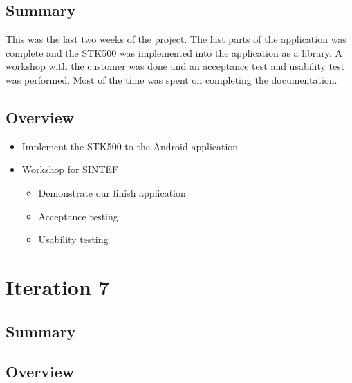 \subsection{Summary}
	This was the last two weeks of the project. The last parts of the application was complete and the STK500 was implemented into the application as a library.
	A workshop with the customer was done and an acceptance test and usability test was performed. Most of the time was spent on completing the documentation.

\subsection{Overview}
\begin{itemize}
	\item{Implement the STK500 to the Android application}
	\item{Workshop for SINTEF}
		\begin{itemize}
		\item{Demonstrate our finish application}
		\item{Acceptance testing}
		\item{Usability testing}
	\end{itemize}
\end{itemize}

\section{Iteration 7}

\subsection{Summary}

\subsection{Overview}

